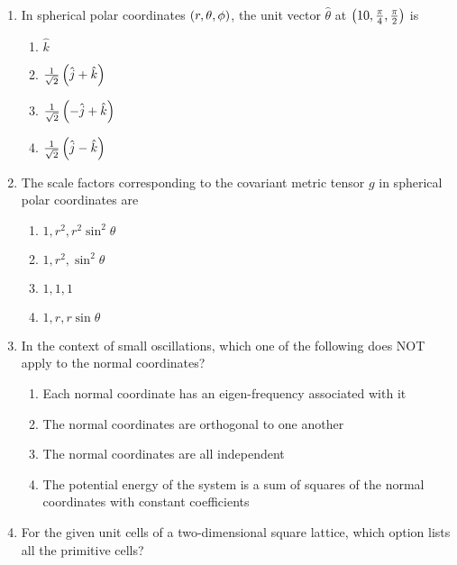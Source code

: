 \documentclass[journal,12pt,twocolumn]{IEEEtran}
\theoremstyle{remark}
\begin{document}
\begin{enumerate}[start=1]
\item In spherical polar coordinates $ \left(r, \theta, \phi\right) $, the unit vector $\hat{\theta}$ at $\left(10, \frac{\pi}{4}, \frac{\pi}{2}\right)$ is
\begin{enumerate}
    \item $\hat{k}$
    \item $\frac{1}{\sqrt{2}} \left(\hat{j} + \hat{k}\right)$
    \item $\frac{1}{\sqrt{2}} \left(-\hat{j} + \hat{k}\right)$
    \item $\frac{1}{\sqrt{2}} \left(\hat{j} - \hat{k}\right)$
\end{enumerate}

\item The scale factors corresponding to the covariant metric tensor $g$ in spherical polar coordinates are
\begin{enumerate}
    \item $1, r^2, r^2 \sin^2 \theta$
    \item $1, r^2, \sin^2 \theta$
    \item $1, 1, 1$
    \item $1, r, r \sin \theta$
\end{enumerate}

\item In the context of small oscillations, which one of the following does NOT apply to the normal coordinates?
\begin{enumerate}
    \item Each normal coordinate has an eigen-frequency associated with it
    \item The normal coordinates are orthogonal to one another
    \item The normal coordinates are all independent
    \item The potential energy of the system is a sum of squares of the normal coordinates with constant coefficients
\end{enumerate}

\item For the given unit cells of a two-dimensional square lattice, which option lists all the primitive cells?\\
\begin{figure}[!ht]
\centering
{}
\end{figure}
\end{enumerate}
\end{document}
